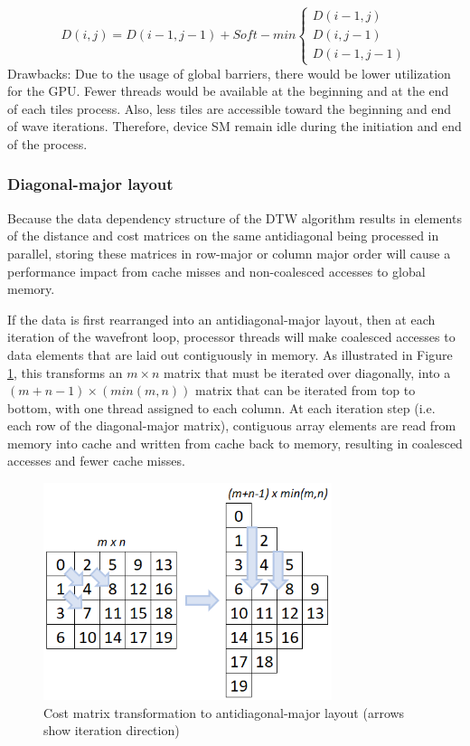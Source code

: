 \documentclass[12pt, letterpaper]{article}
\begin{document}
\begin{equation} \label{dependencies}
  D (i,j) = D(i-1, j-1) + Soft-min
  \begin{cases}
        D(i-1,j) \\
        D(i,j-1)\\
        D(i-1,j-1)
  \end{cases}
\end{equation}
Drawbacks: Due to the usage of global barriers, there would be lower utilization
for the GPU.  Fewer threads would be available at the beginning and at the end
of each tiles process.  Also, less tiles are accessible toward the beginning and
end of wave iterations.  Therefore, device SM remain idle during the initiation
and end of the process.

\subsubsection{Diagonal-major layout}

Because the data dependency structure of the DTW algorithm results in elements
of the distance and cost matrices on the same antidiagonal being processed in
parallel, storing these matrices in row-major or column major order will cause a
performance impact from cache misses and non-coalesced accesses to global
memory.

If the data is first rearranged into an antidiagonal-major layout, then at each
iteration of the wavefront loop, processor threads will make coalesced accesses
to data elements that are laid out contiguously in memory. As illustrated in
Figure \ref{diagonal_layout}, this transforms an $m \times n$ matrix that must be
iterated over diagonally, into a $(m+n-1) \times (min(m,n))$ matrix that can be
iterated from top to bottom, with one thread assigned to each column. At each
iteration step (i.e. each row of the diagonal-major matrix), contiguous array
elements are read from memory into cache and written from cache back to memory,
resulting in coalesced accesses and fewer cache misses.

\begin{figure}[htbp]
  \includegraphics[height=2.5in]{img/diagonal_layout.png}
  \centering
  \caption{Cost matrix transformation to antidiagonal-major layout (arrows show
    iteration direction)}
  \label{diagonal_layout}
  \end{figure}
\end{document}
